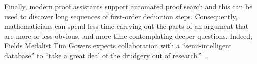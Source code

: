 \documentclass[11pt]{amsart}  %
\begin{document}



Finally, modern proof assistants support automated proof search and this can be used to discover long sequences of first-order deduction steps.
Consequently, mathematicians can spend less time carrying out the parts of an argument that are more-or-less obvious, and more time contemplating deeper questions.
Indeed, Fields Medalist Tim Gowers expects collaboration with a ``semi-intelligent database'' to ``take a great deal of the drudgery out of research.''~\cite{gowers:2017}.



\end{document}
